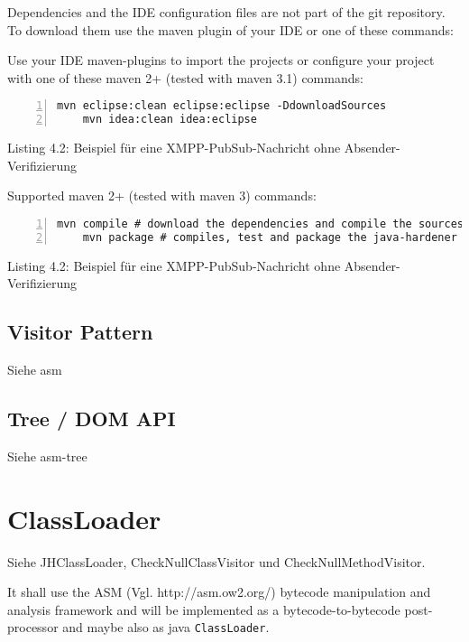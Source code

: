 Dependencies and the IDE configuration files are not part of the git repository.
To download them use the maven plugin of your IDE or one of these commands:

Use your IDE maven-plugins to import the projects or configure your project
with one of these maven 2+ (tested with maven 3.1) commands:

\begin{lstlisting}[basicstyle=\ttfamily,numbers=left,numberstyle=\footnotesize\ttfamily,backgroundcolor=\color{source}]
	mvn eclipse:clean eclipse:eclipse -DdownloadSources
	mvn idea:clean idea:eclipse
\end{lstlisting}
\centerline{Listing 4.2: Beispiel für eine XMPP-PubSub-Nachricht ohne Absender-Verifizierung}

Supported maven 2+ (tested with maven 3) commands:

\begin{lstlisting}[basicstyle=\ttfamily,numbers=left,numberstyle=\footnotesize\ttfamily,backgroundcolor=\color{source}]
	mvn compile # download the dependencies and compile the sources
	mvn package # compiles, test and package the java-hardener sources
\end{lstlisting}
\centerline{Listing 4.2: Beispiel für eine XMPP-PubSub-Nachricht ohne Absender-Verifizierung}

\vspace{0.3cm}


\subsection{Visitor Pattern}

Siehe asm

\subsection{Tree / DOM API}

Siehe asm-tree

\section{ClassLoader}

Siehe JHClassLoader, CheckNullClassVisitor und CheckNullMethodVisitor.

It shall use the ASM (Vgl. http://asm.ow2.org/) bytecode manipulation and analysis framework
and will be implemented as a bytecode-to-bytecode post-processor and maybe also as java \texttt{ClassLoader}.


